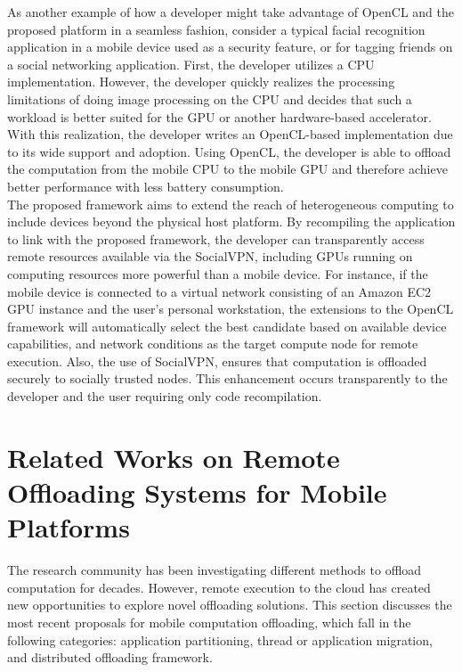 %
As another example of how a developer might take advantage of
OpenCL and the proposed platform in a seamless fashion, consider a
typical facial recognition application in a mobile device
used as a security feature, or for tagging friends on a social
networking application.
%
First, the developer utilizes a CPU implementation.
%
However, the developer quickly realizes the processing limitations of
doing image processing on the CPU and decides that such a workload is
better suited for the GPU or another hardware-based accelerator.
%
With this realization, the developer writes an OpenCL-based
implementation due to its wide support and adoption.
%
Using OpenCL, the developer is able to offload the computation from the
mobile CPU to the mobile GPU and therefore achieve better performance
with less battery consumption.\\
%
The proposed framework aims to extend the reach of heterogeneous
computing to include devices beyond the physical host platform.
%
By recompiling the application to link with the proposed framework, the
developer can transparently access remote resources available via the
SocialVPN, including GPUs running on computing resources more powerful
than a mobile device.
%
For instance, if the mobile device is connected to a virtual network
consisting of an Amazon EC2 GPU instance and the user's personal
workstation, the extensions to the OpenCL framework will automatically
select the best candidate based on available device capabilities, and
network conditions as the target compute node for remote execution.
%
Also, the use of SocialVPN, ensures that computation is offloaded
securely to socially trusted nodes.
%
This enhancement occurs transparently to the developer and the user
requiring only code recompilation. 
%

\section{Related Works on Remote Offloading Systems for Mobile Platforms}
\label{intro:relatedwork}

The research community has been investigating different methods to
offload computation for decades.
%
However, remote execution to the cloud has created new opportunities to
explore novel offloading solutions.
%
This section discusses the most recent proposals for mobile computation
offloading, which fall in the following categories: application
partitioning, thread or application migration, and distributed
offloading framework.
%
